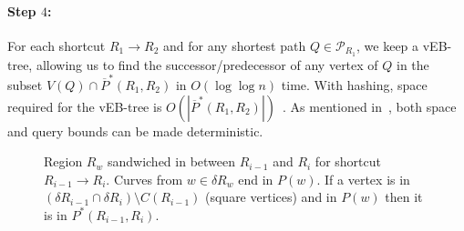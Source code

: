 \documentclass[11pt]{article}
\begin{document}
\paragraph{Step $4$:} For each shortcut $R_1\rightarrow R_2$ and for any shortest path $Q\in\mathcal P_{R_1}$, we keep a vEB-tree, allowing us to find the successor/predecessor of any vertex of $Q$ in the subset $V(Q)\cap\overline P^*(R_1,R_2)$ in $O(\log\log n)$ time. With hashing, space required for the vEB-tree is $O(|\overline P^*(R_1,R_2)|)$~\cite{Predecessor,RangeQueries}. As mentioned in~\cite{Predecessor}, both space and query bounds can be made deterministic.
\begin{figure}\centerline{}
\caption{Region $R_w$ sandwiched in between $R_{i-1}$ and $R_i$ for shortcut $R_{i-1}\rightarrow R_i$. Curves from $w\in\delta R_w$ end in $P(w)$. If a vertex is in $(\delta R_{i-1}\cap\delta R_i)\setminus C(R_{i-1})$ (square vertices) and in $P(w)$ then it is in $P^*(R_{i-1},R_i)$.}
\label{fig:PhaseIIData}
\end{figure}
\end{document}
